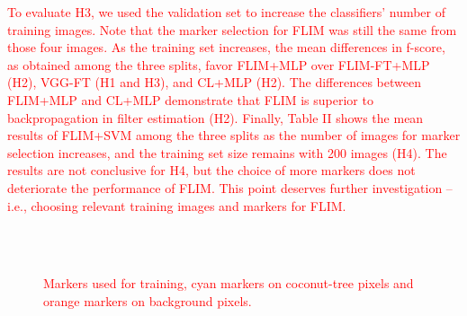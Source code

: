 \documentclass[journal, twoside]{IEEEtran}
\begin{document}
\textcolor{red}{To evaluate H3, we used the validation set to increase the classifiers' number of training images. Note that the marker selection for FLIM was still the same from those four images. As the training set increases, the mean differences in f-score, as obtained among the three splits, favor FLIM+MLP over FLIM-FT+MLP (H2), VGG-FT (H1 and H3), and CL+MLP (H2). The differences between FLIM+MLP and CL+MLP demonstrate that FLIM is superior to backpropagation in filter estimation (H2). Finally, Table II shows the mean results of FLIM+SVM among the three splits as the number of images for marker selection increases, and the training set size remains with 200 images (H4). The results are not conclusive for H4, but the choice of more markers does not deteriorate the performance of FLIM. This point deserves further investigation -- i.e., choosing relevant training images and markers for FLIM. }  


\begin{figure}[!t]
    \centering
    ~
    \\
    ~
    \caption{\textcolor{red}{Markers used for training, cyan markers on coconut-tree pixels and orange markers on background pixels.}}
    \label{fig:markers}
\end{figure}
\end{document}

